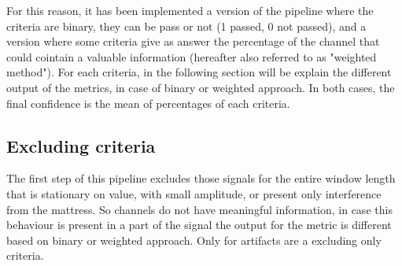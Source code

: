 For this reason, it has been implemented a version of the pipeline where the criteria are binary, they can be pass or not (1 passed, 0 not passed), and a version where some criteria give as answer the percentage of the channel that could cointain a valuable information (hereafter also referred to as "weighted method"). For each criteria, in the following section will be explain the different output of the metrics, in case of binary or weighted approach.
In both cases, the final confidence is the mean of percentages of each criteria.

\subsection{Excluding criteria}\label{cap:excCrit}
The first step of this pipeline excludes those signals for the entire window length that is stationary on value, with small amplitude, or present only interference from the mattress. So channels do not have meaningful information, in case this behaviour is present in a part of the signal the output for the metric is different based on binary or weighted approach. Only for artifacts are a excluding only criteria.

